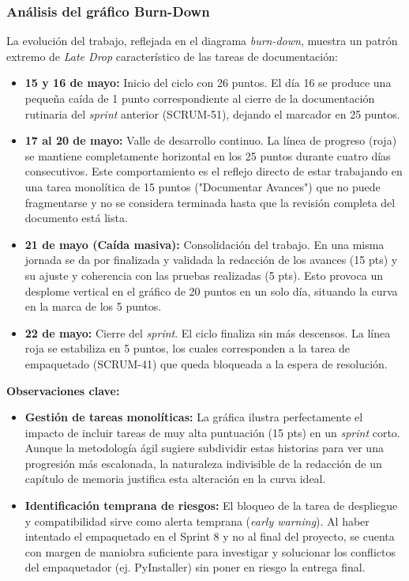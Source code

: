 \subsubsection{Análisis del gráfico Burn-Down}

La evolución del trabajo, reflejada en el diagrama \textit{burn-down}, muestra un patrón extremo de \textit{Late Drop} característico de las tareas de documentación:

\begin{itemize}
    \item \textbf{15 y 16 de mayo:} Inicio del ciclo con 26 puntos. El día 16 se produce una pequeña caída de 1 punto correspondiente al cierre de la documentación rutinaria del \textit{sprint} anterior (SCRUM-51), dejando el marcador en 25 puntos.
    \item \textbf{17 al 20 de mayo:} Valle de desarrollo continuo. La línea de progreso (roja) se mantiene completamente horizontal en los 25 puntos durante cuatro días consecutivos. Este comportamiento es el reflejo directo de estar trabajando en una tarea monolítica de 15 puntos ("Documentar Avances") que no puede fragmentarse y no se considera terminada hasta que la revisión completa del documento está lista.
    \item \textbf{21 de mayo (Caída masiva):} Consolidación del trabajo. En una misma jornada se da por finalizada y validada la redacción de los avances (15 pts) y su ajuste y coherencia con las pruebas realizadas (5 pts). Esto provoca un desplome vertical en el gráfico de 20 puntos en un solo día, situando la curva en la marca de los 5 puntos.
    \item \textbf{22 de mayo:} Cierre del \textit{sprint}. El ciclo finaliza sin más descensos. La línea roja se estabiliza en 5 puntos, los cuales corresponden a la tarea de empaquetado (SCRUM-41) que queda bloqueada a la espera de resolución.
\end{itemize}


\noindent\textbf{Observaciones clave:}
\begin{itemize}
    \item \textbf{Gestión de tareas monolíticas:} La gráfica ilustra perfectamente el impacto de incluir tareas de muy alta puntuación (15 pts) en un \textit{sprint} corto. Aunque la metodología ágil sugiere subdividir estas historias para ver una progresión más escalonada, la naturaleza indivisible de la redacción de un capítulo de memoria justifica esta alteración en la curva ideal.
    \item \textbf{Identificación temprana de riesgos:} El bloqueo de la tarea de despliegue y compatibilidad sirve como alerta temprana (\textit{early warning}). Al haber intentado el empaquetado en el Sprint 8 y no al final del proyecto, se cuenta con margen de maniobra suficiente para investigar y solucionar los conflictos del empaquetador (ej. PyInstaller) sin poner en riesgo la entrega final.
\end{itemize}


